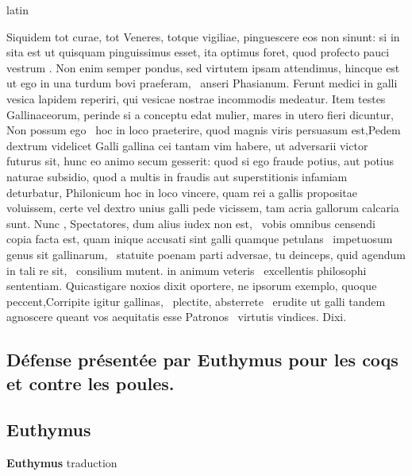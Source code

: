 \documentclass[12pt]{book}
\renewenvironment{latin}
    	{\begin{hyphenrules}{latin}}
    	{\end{hyphenrules}}
\begin{document}
\begin{pages}
\begin{latin}
\begin{Leftside}
                  Siquidem tot curae, tot Veneres, totque vigiliae, pinguescere eos non  sinunt:  si in 
                  sita est  ut quisquam pinguissimus esset, ita optimus foret, quod profecto pauci vestrum .
                  Non enim semper pondus, sed virtutem ipsam attendimus, hincque est ut ego in  una turdum bovi praeferam,  \ampersand\ anseri Phasianum. 
                  Ferunt medici in galli vesica lapidem reperiri, qui vesicae nostrae incommodis medeatur. Item testes Gallinaceorum, perinde si a conceptu edat mulier, mares in utero fieri dicuntur, 
                  Non possum ego  \ampersand\ hoc in loco praeterire, quod magnis viris persuasum est,Pedem dextrum videlicet Galli gallina cei tantam vim habere, ut adversarii victor futurus sit, 
                   hunc eo animo secum gesserit: quod si ego fraude potius, aut potius naturae subsidio, 
                  quod a multis in fraudis aut superstitionis infamiam deturbatur, Philonicum hoc in loco vincere, quam rei a gallis propositae 
                  voluissem, certe vel dextro unius galli pede vicissem, tam acria gallorum calcaria sunt. Nunc , Spectatores, dum alius iudex non est,
                   \ampersand\ vobis omnibus censendi  \ampersand\  copia facta est, quam inique accusati sint galli quamque petulans  \ampersand\ impetuosum genus sit gallinarum, 
                   \ampersand\ statuite poenam parti adversae, tu deinceps, quid agendum in tali re sit,   \ampersand\ consilium mutent. 
                   in animum veteris  \ampersand\ excellentis philosophi sententiam. Quicastigare noxios dixit oportere, ne ipsorum exemplo, 
                  quoque peccent,Corripite igitur gallinas,  \ampersand\ plectite, absterrete  \ampersand\ erudite ut galli tandem agnoscere queant vos aequitatis esse Patronos  \ampersand\ virtutis vindices. Dixi. \pend 
        \endnumbering
        \end{Leftside}
        \end{latin}

        \begin{Rightside}
        \beginnumbering
            \pstart\section*{Défense présentée par Euthymus pour les coqs et contre les poules.}\pend\pstart\subsection*{Euthymus}\pend\pstart\textbf{Euthymus}\hspace{1cm}  traduction \pend
        \endnumbering
        \end{Rightside}
        \end{pages}
        \Pages
        
\end{document}
